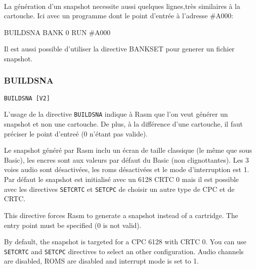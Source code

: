 \paragraph{}

\begin{xfr}
La génération d'un snapshot necessite aussi quelques lignes,très similaires à la cartouche. Ici avec un programme dont le point d'entrée à l'adresse \#A000:
\end{xfr}

\begin{xen}
\end{xen}

\begin{code}
BUILDSNA
BANK 0
RUN \#A000
\end{code}

\begin{xfr}
Il est aussi possible d'utiliser la directive BANKSET pour generer un fichier snapshot.
\end{xfr}

\subsubsection{BUILDSNA}
\begin{verbatim}
BUILDSNA [V2]
\end{verbatim}

\begin{xfr}
L'usage de la directive \texttt{BUILDSNA} indique à Rasm que l'on veut générer un snapshot et non une cartouche.  De plus, à la différence d'une cartouche, il faut préciser le point d'entreé (0 n'étant pas valide).

Le snapshot généré par Rasm inclu un écran de taille classique (le même que sous Basic), les encres sont aux valeurs par défaut du Basic (non clignottantes). Les 3 voies audio sont désactivées, les roms désactivées et le mode d'interruption est 1. Par défaut le snapshot est initialisé avec un 6128 CRTC 0 mais il est possible avec les directives \texttt{SETCRTC} et \texttt{SETCPC} de choisir un autre type de CPC et de CRTC.
\end{xfr}


\begin{xen}
This directive forces Rasm to generate a snapshot instead of a cartridge. 
The entry point must be specified (0 is not valid).

By default, the snapshot is targeted for a CPC 6128 with CRTC 0. You can use \texttt{SETCRTC} and \texttt{SETCPC} directives to select an other configuration. 
Audio channels are disabled, ROMS are disabled and interrupt mode is set to 1.
\end{xen}


